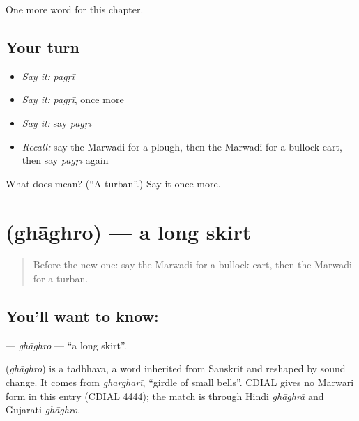 \begin{grammarlens}[title={What you've built}]
One more word for this chapter.
\end{grammarlens}

\subsection*{Your turn}
\begin{itemize}
\raggedright
  \item \emph{Say it:} \emph{pagṛī}
  \item \emph{Say it:} \emph{pagṛī}, once more
  \item \emph{Say it:} say \emph{pagṛī}
  \item \emph{Recall:} say the Marwadi for a plough, then the Marwadi for a bullock cart, then say \emph{pagṛī} again
\end{itemize}

\begin{tcolorbox}[breakable,colback=teal!4,colframe=teal!35!black,title={Before you move on}]
What does  mean? (\textquotedblleft{}A turban\textquotedblright{}.) Say it once more.
\end{tcolorbox}
\section[\texorpdfstring{\mw{घाघरो} (ghāghro)}{घाघरो (ghāghro)}]{ (ghāghro) — a long skirt}

\label{lesson:MW-C128-ghaghro}



\begin{quote}
Before the new one: say the Marwadi for a bullock cart, then the Marwadi for a turban.
\end{quote}

\subsection*{You'll want to know: }
\textbf{} — \emph{ghāghro} — \textquotedblleft{}a long skirt\textquotedblright{}.

\begin{cousinweb}
\textbf{} (\emph{ghāghro}) is a tadbhava, a word inherited from Sanskrit and reshaped by sound change. It comes from \emph{ghargharī}, \textquotedblleft{}girdle of small bells\textquotedblright{}. CDIAL gives no Marwari form in this entry (CDIAL 4444); the match is through Hindi \emph{ghāghrā} and Gujarati \emph{ghāghro}.
\end{cousinweb}

